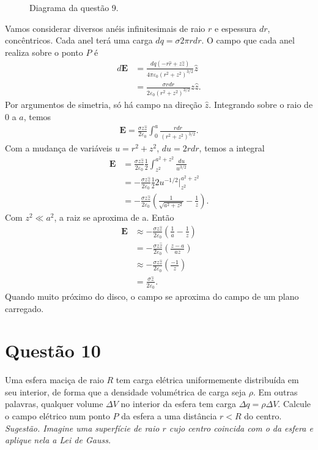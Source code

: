 \documentclass[11pt]{article}
\begin{document}
\begin{figure}[h!]
  \centering
  \caption{Diagrama da questão 9.}
  \label{fig:ex-9}
\end{figure}
Vamos considerar diversos anéis infinitesimais de raio \(r\) e espessura
\(dr\), concêntricos. Cada anel terá uma carga \(dq = \sigma2\pi rdr\). O campo que
cada anel realiza sobre o ponto \(P\) é
\begin{align*}
  d\mathbf E &= \frac{dq(-r\hat r+z\hat z)}{4\pi\varepsilon_0(r^2+z^2)^{3/2}}\hat z\\
             &= \frac{\sigma rdr}{2\varepsilon_0(r^2+z^2)^{3/2}}z\hat z. 
\end{align*}
Por argumentos de simetria, só há campo na direção \(\hat z\).
Integrando sobre o raio de \(0\) a \(a\), temos
\begin{align*}
  \mathbf E = \frac{\sigma z\hat z}{2\varepsilon_0}\int_0^a \frac{rdr}{(r^2+z^2)^{3/2}}.
\end{align*}
Com a mudança de variáveis \(u=r^2+z^2\), \(du = 2rdr\), temos a integral
\begin{align*}
  \mathbf E &= \frac{\sigma z\hat z}{2\varepsilon_0}\frac12\int_{z^2}^{a^2+z^2} \frac{du}{u^{3/2}}\\
            &= -\frac{\sigma z\hat z}{2\varepsilon_0}\frac12 2{u^{-1/2}}\big\vert_{z^2}^{a^2+z^2}\\
            &= -\frac{\sigma z\hat z}{2\varepsilon_0}\left(\frac1{\sqrt{a^2+z^2}}-\frac1z\right).
\end{align*}
Com \(z^2 \ll a^2\), a raiz se aproxima de a. Então
\begin{align*}
  \mathbf E &\approx -\frac{\sigma z\hat z}{2\varepsilon_0}\left(\frac1a-\frac1z\right)\\
            &= -\frac{\sigma z\hat z}{2\varepsilon_0}\left(\frac{z-a}{az}\right)\\
            &\approx -\frac{\sigma z\hat z}{2\varepsilon_0}\left(\frac{-1}{z}\right)\\
            &= \frac{\sigma \hat z}{2\varepsilon_0}.
\end{align*}
Quando muito próximo do disco, o campo se aproxima do campo de um plano
carregado. 
\section{Questão 10}
\label{sec:orgc6b5260}
Uma esfera maciça de raio \(R\) tem carga elétrica uniformemente
distribuída em seu interior, de forma que a densidade volumétrica de
carga seja \(\rho\). Em outras palavras, qualquer volume \(\Delta V\) no interior da
esfera tem carga \(\Delta q=\rho\Delta V\). Calcule o campo elétrico num ponto \(P\) da
esfera a uma distância \(r<R\) do centro. \emph{Sugestão. Imagine uma}
\emph{superfície de raio \(r\) cujo centro coincida com o da esfera e aplique}
\emph{nela a Lei de Gauss.}
\end{document}
